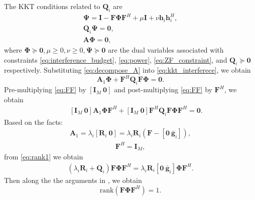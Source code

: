 \documentclass[journal]{IEEEtran}
\begin{document}
The KKT conditions related to $\mathbf{Q}_i$ are 
\begin{eqnarray}
	\mathbf{\Psi}=\mathbf{I} - \mathbf{F}\mathbf{\Phi}\mathbf{F}^H + \mu\mathbf{I} + \nu\mathbf{h}_i\mathbf{h}_i^H\label{eq:rank_n-1},\\
	\mathbf{Q}_i\mathbf{\Psi} = \mathbf{0} \label{eq:nullity},\\
	\mathbf{A}\mathbf{\Phi} = \mathbf{0} \label{eq:kkt_interferece},
\end{eqnarray}
where $\mathbf{\Phi} \succeq \mathbf{0},\mu \geq 0,\nu \geq 0,\mathbf{\Psi} \succeq \mathbf{0}$ are the dual variables associated with constraints \eqref{eq:interference_budget}, \eqref{eq:power}, \eqref{eq:ZF_constraint}, and $\mathbf{Q}_i \succeq \mathbf{0}$ respectively.
Substituting \eqref{eq:decompose_A} into \eqref{eq:kkt_interferece}, we obtain
\begin{equation} \label{eq:FF}
\mathbf{A}_1\mathbf{\Phi} + \mathbf{F}^H\mathbf{Q}_i\mathbf{F}\mathbf{\Phi} = \mathbf{0}.
\end{equation}
Pre-multiplying \eqref{eq:FF} by $[\mathbf{I}_{M}~\mathbf{0}]$ and post-multiplying \eqref{eq:FF} by $\mathbf{F}^H$, we obtain
\begin{eqnarray}
&&[\mathbf{I}_{M}~\mathbf{0}]\mathbf{A}_1\mathbf{\Phi}\mathbf{F}^H + [\mathbf{I}_{M}~\mathbf{0}]\mathbf{F}^H\mathbf{Q}_i\mathbf{F}\mathbf{\Phi}\mathbf{F}^H = \mathbf{0}. \label{eq:rank1}
\end{eqnarray}
Based on the facts:
\begin{eqnarray}
[\mathbf{I}_{M}~\mathbf{0}]\mathbf{A}_1 = \lambda_i[\mathbf{R}_i ~\mathbf{0}] =\lambda_i\mathbf{R}_i\left(\mathbf{F} - [\mathbf{0}~\bar{\mathbf{g}}_i ]\right),\nonumber
\end{eqnarray}
\begin{eqnarray}
[\mathbf{I}_{M}~\mathbf{0}]\mathbf{F}^H = \mathbf{I}_M \nonumber,
\end{eqnarray}
from \eqref{eq:rank1} we obtain
\begin{eqnarray}
\left(\lambda_i\mathbf{R}_i + \mathbf{Q}_i\right)\mathbf{F}\mathbf{\Phi}\mathbf{F}^H = \lambda_i \mathbf{R}_i[\mathbf{0}~\bar{\mathbf{g}}_i ]\mathbf{\Phi}\mathbf{F}^H.
\end{eqnarray}
Then along the the arguments in \cite{li_optimal_2011}, we obtain 
\begin{equation}\label{eq:rank11}
\text{rank}\left(\mathbf{F}\mathbf{\Phi}\mathbf{F}^H\right)=1.
\end{equation}
\end{document}

